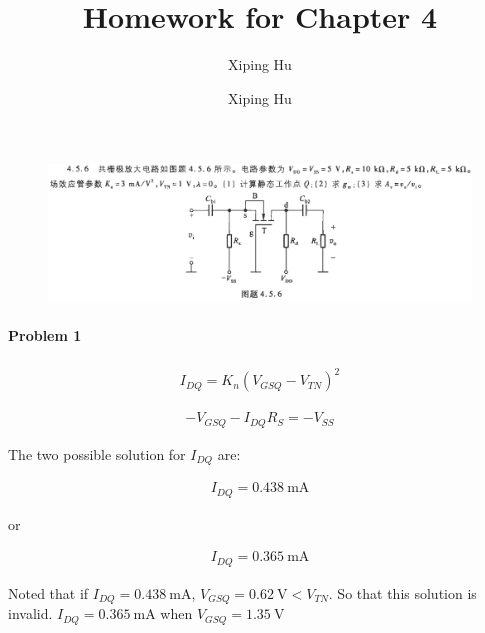 \documentclass{article}
\author{Xiping Hu}
\author{Xiping Hu}
\affil{https://hxp.plus/}
\title{Homework for Chapter 4}
\begin{document}
\maketitle

\begin{figure}[H]
  \centering
  \includegraphics[width=\linewidth]{figures/Problem456}
  \label{fig:}
\end{figure}

\paragraph{Problem 1}

\begin{equation*}
  \begin{aligned}
    I_{DQ} = K_n \left( V_{GSQ} - V_{TN} \right)^2
  \end{aligned}
\end{equation*}

\begin{equation*}
  \begin{aligned}
    - V_{GSQ} - I_{DQ} R_S = - V_{SS}
  \end{aligned}
\end{equation*}

The two possible solution for $I_{DQ}$ are:

\begin{equation*}
  \begin{aligned}
    I_{DQ} = 0.438 \  \mathrm{mA}
  \end{aligned}
\end{equation*}

or

\begin{equation*}
  \begin{aligned}
    I_{DQ} = 0.365 \  \mathrm{mA}
  \end{aligned}
\end{equation*}

Noted that if $I_{DQ} = 0.438 \  \mathrm{mA}$, $V_{GSQ} = 0.62 \  \mathrm{V} < V_{TN} $. So that this solution is invalid. $I_{DQ} = 0.365 \  \mathrm{mA}$ when $V_{GSQ} = 1.35 \  \mathrm{V}$
\end{document}
